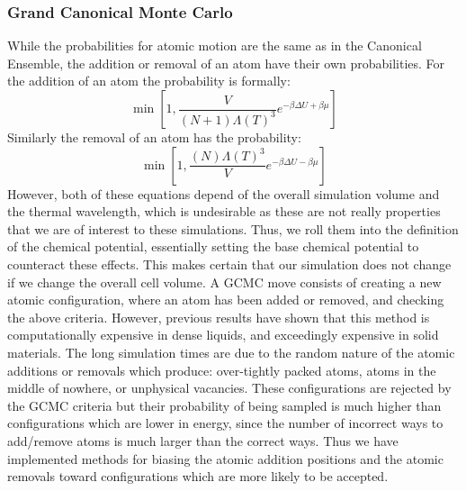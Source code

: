 \subsubsection{Grand Canonical Monte Carlo}
While the probabilities for atomic motion are the same as in the Canonical Ensemble, the addition or removal of an atom have their own probabilities. For the addition of an atom the probability is formally:
\begin{equation}
  \min[1, \frac{V}{(N+1) \Lambda(T)^{3}}e^{-\beta\Delta U + \beta \mu}]
\end{equation}
Similarly the removal of an atom has the probability:
\begin{equation}
  \min[1, \frac{(N)\Lambda(T)^{3}}{V}e^{-\beta\Delta U - \beta \mu}]
\end{equation}
However, both of these equations depend of the overall simulation volume and the thermal wavelength, which is undesirable as these are not really properties that we are of interest to these simulations.
Thus, we roll them into the definition of the chemical potential, essentially setting the base chemical potential to counteract these effects.
This makes certain that our simulation does not change if we change the overall cell volume.
A GCMC move consists of creating a new atomic configuration, where an atom has been added or removed, and checking the above criteria.
However, previous results have shown that this method is computationally expensive in dense liquids, and exceedingly expensive in solid materials.
The long simulation times are due to the random nature of the atomic additions or removals which produce: over-tightly packed atoms, atoms in the middle of nowhere, or unphysical vacancies.  
These configurations are rejected by the GCMC criteria but their probability of being sampled is much higher than configurations which are lower in energy, since the number of incorrect ways to add/remove atoms is much larger than the correct ways.
Thus we have implemented methods for biasing the atomic addition positions and the atomic removals toward configurations which are more likely to be accepted.
